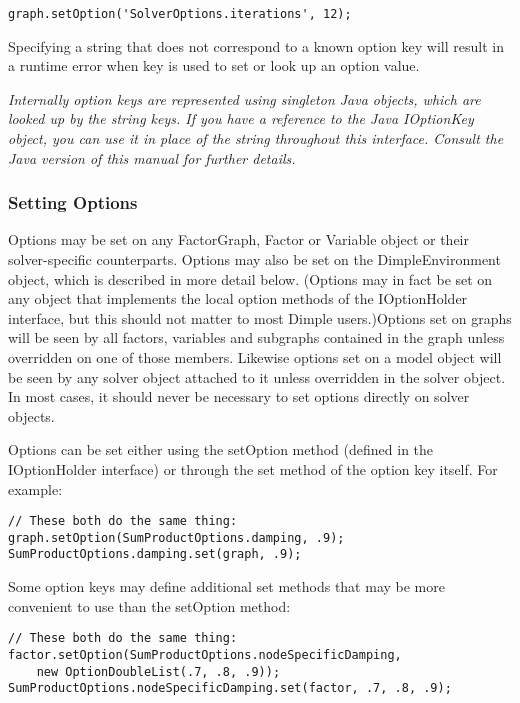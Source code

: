\begin{lstlisting}
graph.setOption('SolverOptions.iterations', 12);
\end{lstlisting}

Specifying a string that does not correspond to a known option key will result in a runtime error when key is used to set or look up an option value.

\emph{Internally option keys are represented using singleton Java objects, which are looked up by the string keys. If you have a reference to the Java IOptionKey object, you can use it in place of the string throughout this interface. Consult the Java version of this manual for further details.}
\fi

\subsubsection{Setting Options}

Options may be set on any FactorGraph, Factor or Variable object or their solver-specific counterparts. Options may also be set on the DimpleEnvironment object, which is described in more detail below. \ifjava(Options may in fact be set on any object that implements the local option methods of the IOptionHolder interface, but this should not matter to most Dimple users.)\fi Options set on graphs will be seen by all factors, variables and subgraphs contained in the graph unless overridden on one of those members. Likewise options set on a model object will be seen by any solver object attached to it unless overridden in the solver object. In most cases, it should never be necessary to set options directly on solver objects.

\ifjava
Options can be set either using the setOption method (defined in the IOptionHolder interface) or through the set method of the option key itself. For example:

\begin{lstlisting}
// These both do the same thing:
graph.setOption(SumProductOptions.damping, .9);
SumProductOptions.damping.set(graph, .9);
\end{lstlisting}

Some option keys may define additional set methods that may be more convenient to use than the setOption method:

\begin{lstlisting}
// These both do the same thing:
factor.setOption(SumProductOptions.nodeSpecificDamping,
    new OptionDoubleList(.7, .8, .9));
SumProductOptions.nodeSpecificDamping.set(factor, .7, .8, .9);
\end{lstlisting}
\fi

